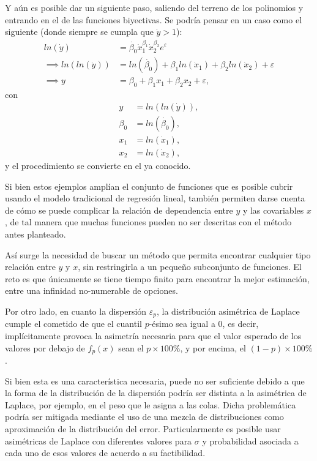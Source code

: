 Y a\'un es posible dar un siguiente paso, saliendo del terreno de los polinomios y entrando en el de las funciones biyectivas. Se podr\'ia pensar en un caso como el siguiente (donde siempre se cumpla que $\dot{y} > 1$):
\begin{equation*}
\begin{aligned}
    ln(\dot{y}) &= \dot{\beta_0}\dot{x}_1^{\beta_1}\dot{x}_2^{\beta_2} e^{\varepsilon} \\
    \implies ln(ln(\dot{y})) &= ln(\dot{\beta_0}) + \beta_1 ln(\dot{x}_1) + \beta_2 ln(\dot{x}_2) + \varepsilon \\
    \implies y &= \beta_0 + \beta_1 x_1 + \beta_2 x_2 + \varepsilon, 
\end{aligned}
\end{equation*}
con
\begin{equation*}
\begin{aligned}
    y &= ln(ln(\dot{y})), \\
    \beta_0 &= ln(\dot{\beta_0}), \\
    x_1 &= ln(\dot{x}_1), \\
    x_2 &= ln(\dot{x}_2),
\end{aligned}
\end{equation*}
y el procedimiento se convierte en el ya conocido.

Si bien estos ejemplos ampl\'ian el conjunto de funciones que es posible cubrir usando el modelo tradicional de regresi\'on lineal, tambi\'en permiten darse cuenta de c\'omo se puede complicar la relaci\'on de dependencia entre $y$ y las covariables $x$, de tal manera que muchas funciones pueden no ser descritas con el m\'etodo antes planteado.

As\'i surge la necesidad de buscar un m\'etodo que permita encontrar cualquier tipo relaci\'on entre $y$ y $x$, sin restringirla a un pequeño subconjunto de funciones. El reto es que \'unicamente se tiene tiempo finito para encontrar la mejor estimaci\'on, entre una infinidad no-numerable de opciones.

Por otro lado, en cuanto la dispersi\'on $\varepsilon_p$, la distribuci\'on asim\'etrica de Laplace cumple el cometido de que el cuantil $p$-\'esimo sea igual a 0, es decir, impl\'icitamente provoca la asimetr\'ia necesaria para que el valor esperado de los valores por debajo de $f_p(x)$ sean el $p \times 100\%$, y por encima, el $(1-p) \times 100\%$.

Si bien esta es una caracter\'istica necesaria, puede no ser suficiente debido a que la forma de la distribuci\'on de la dispersi\'on podr\'ia ser distinta a la asim\'etrica de Laplace, por ejemplo, en el peso que le asigna a las colas. Dicha problem\'atica podr\'ia ser mitigada mediante el uso de una mezcla de distribuciones como aproximaci\'on de la distribuci\'on del error.  Particularmente es posible usar asim\'etricas de Laplace con diferentes valores para $\sigma$ y probabilidad asociada a cada uno de esos valores de acuerdo a su factibilidad. 

